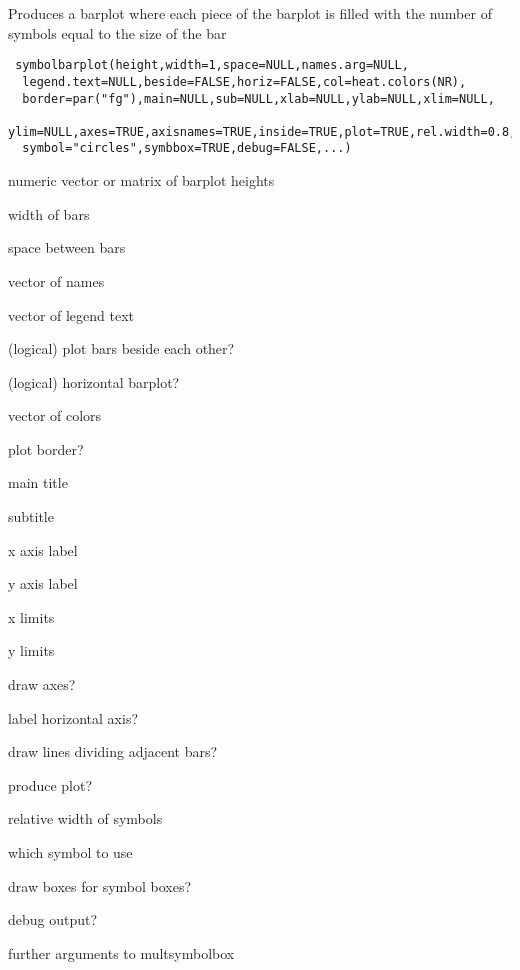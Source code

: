 \begin{Description}\relax
Produces a barplot where each piece of the barplot is filled with the
number of symbols equal to the size of the bar
\end{Description}
\begin{Usage}
\begin{verbatim}
 symbolbarplot(height,width=1,space=NULL,names.arg=NULL,
  legend.text=NULL,beside=FALSE,horiz=FALSE,col=heat.colors(NR),
  border=par("fg"),main=NULL,sub=NULL,xlab=NULL,ylab=NULL,xlim=NULL,
  ylim=NULL,axes=TRUE,axisnames=TRUE,inside=TRUE,plot=TRUE,rel.width=0.8,
  symbol="circles",symbbox=TRUE,debug=FALSE,...)
\end{verbatim}
\end{Usage}
\begin{Arguments}
\begin{ldescription}
\item[\code{height}] numeric vector or matrix of barplot heights
\item[\code{width}] width of bars
\item[\code{space}] space between bars
\item[\code{names.arg}] vector of names
\item[\code{legend.text}] vector of legend text
\item[\code{beside}] (logical) plot bars beside each other?
\item[\code{horiz}] (logical) horizontal barplot?
\item[\code{col}] vector of colors
\item[\code{border}] plot border?
\item[\code{main}] main title
\item[\code{sub}] subtitle
\item[\code{xlab}] x axis label
\item[\code{ylab}] y axis label
\item[\code{xlim}] x limits
\item[\code{ylim}] y limits
\item[\code{axes}] draw axes?
\item[\code{axisnames}] label horizontal axis?
\item[\code{inside}] draw lines dividing adjacent bars?
\item[\code{plot}] produce plot?
\item[\code{rel.width}] relative width of symbols
\item[\code{symbol}] which symbol to use
\item[\code{symbbox}] draw boxes for symbol boxes?
\item[\code{debug}] debug output?
\item[\code{...}] further arguments to multsymbolbox
\end{ldescription}
\end{Arguments}
